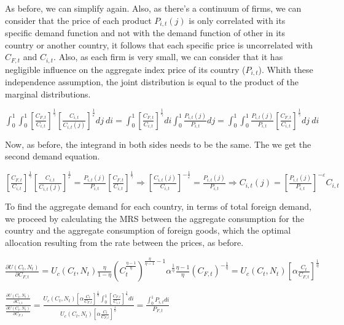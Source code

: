 \documentclass[
]{article}
\begin{document}
As before, we can simplify again. Also, as there's a continuum of firms,
we can consider that the price of each product \(P_{i,t}(j)\) is only
correlated with its specific demand function and not with the demand
function of other in its country or another country, it follows that
each specific price is uncorrelated with \(C_{F,t}\) and \(C_{i,t}\).
Also, as each firm is very small, we can consider that it has negligible
influence on the aggregate index price of its country (\(P_{i,t}\)).
Whith these independence assumption, the joint distribution is equal to
the product of the marginal distributions.

\(\displaystyle \int_0^1 \int_0^1 \left[\frac{C_{F,t}}{C_{i,t}}\right]^{\frac{1}{\gamma}} \left[\frac{C_{i,t}}{C_{i,t}(j)}\right]^{\frac{1}{\varepsilon}}dj \ di = \int_0^1 \left[\frac{C_{F,t}}{C_{i,t}}\right]^{\frac{1}{\gamma}} di \int_0^1 \frac{\displaystyle P_{i,t}(j)}{P_{i,t}}dj = \int_0^1 \int_0^1 \frac{\displaystyle P_{i,t}(j)}{P_{i,t}} \left[\frac{C_{F,t}}{C_{i,t}}\right]^{\frac{1}{\gamma}} dj \ di\)

Now, as before, the integrand in both sides needs to be the same. The we
get the second demand equation.

\(\displaystyle \left[\frac{C_{F,t}}{C_{i,t}}\right]^{\frac{1}{\gamma}} \left[\frac{C_{i,t}}{C_{i,t}(j)}\right]^{\frac{1}{\varepsilon}} = \frac{\displaystyle P_{i,t}(j)}{P_{i,t}} \left[\frac{C_{F,t}}{C_{i,t}}\right]^{\frac{1}{\gamma}} \Rightarrow \left[\frac{C_{i,t}(j)}{C_{i,t}}\right]^{-\frac{1}{\varepsilon}} = \frac{\displaystyle P_{i,t}(j)}{P_{i,t}} \Rightarrow C_{i,t}(j) = \left[ \frac{\displaystyle P_{i,t}(j)}{P_{i,t}} \right]^{-\varepsilon}C_{i,t}\)

To find the aggregate demand for each country, in terms of total foreign
demand, we proceed by calculating the MRS between the aggregate
consumption for the country and the aggregate consumption of foreign
goods, which the optimal allocation resulting from the rate between the
prices, as before.

\(\displaystyle \frac{\partial U(C_t,N_t)}{\partial C_{F,t}} = U_c(C_t,N_t)\frac{\eta}{1-\eta}\left( C_t^{\frac{\eta-1}{\eta}} \right)^{\frac{\eta}{\eta-1}-1} \alpha^{\frac{1}{\eta}}\frac{\eta-1}{\eta}\left( C_{F,t}\right)^{-\frac{1}{\eta}} = U_c(C_t,N_t) \left[ \alpha \frac{C_t}{C_{F,t}} \right]^{\frac{1}{\eta}}\)

\(\displaystyle \frac{\displaystyle \frac{\partial U(C_t,N_t)}{\displaystyle \partial C_{i,t}}}{\frac{\displaystyle \partial U(C_t,N_t)}{\displaystyle \partial C_{F,t}}} = \frac{\displaystyle U_c(C_t,N_t) \left[ \alpha \frac{C_t}{C_{F,t}} \right]^{\frac{1}{\eta}} \int_0^1 \left[\frac{C_{F,t}}{C_{i,t}}\right]^{\frac{1}{\gamma}} di }{\displaystyle U_c(C_t,N_t) \left[ \alpha \frac{C_t}{C_{F,t}} \right]^{\frac{1}{\eta}} } = \frac{\displaystyle \int_0^1P_{i,t}di}{P_{F,t}}\)
\end{document}
